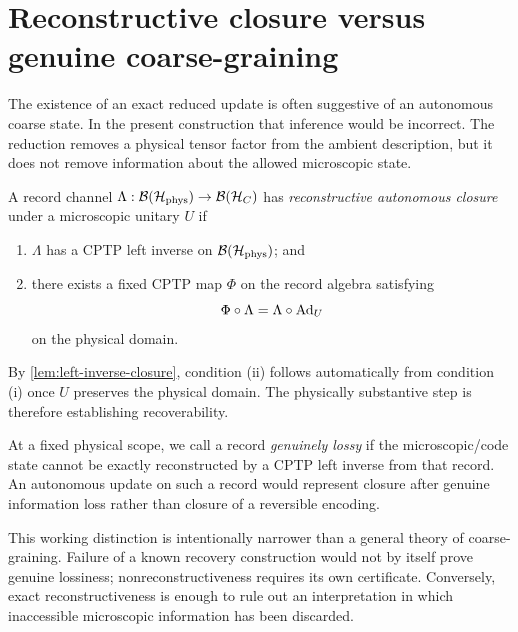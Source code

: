 \section{Reconstructive closure versus genuine coarse-graining}
\label{sec:reconstruction}

The existence of an exact reduced update is often suggestive of an autonomous coarse state.  In the present construction that inference would be incorrect.  The reduction removes a physical tensor factor from the ambient description, but it does not remove information about the allowed microscopic state.

\begin{definition}
A record channel $\Lambda:\mathcal B(\mathcal H_{\mathrm{phys}})\to\mathcal B(\mathcal H_C)$ has \emph{reconstructive autonomous closure} under a microscopic unitary $U$ if
\begin{enumerate}[label=(\roman*)]
  \item $\Lambda$ has a CPTP left inverse on $\mathcal B(\mathcal H_{\mathrm{phys}})$; and
  \item there exists a fixed CPTP map $\Phi$ on the record algebra satisfying
  \begin{equation}
    \Phi\circ\Lambda=\Lambda\circ\operatorname{Ad}_U
  \end{equation}
  on the physical domain.
\end{enumerate}
\end{definition}

By \cref{lem:left-inverse-closure}, condition (ii) follows automatically from condition (i) once $U$ preserves the physical domain.  The physically substantive step is therefore establishing recoverability.

\begin{definition}
At a fixed physical scope, we call a record \emph{genuinely lossy} if the microscopic/code state cannot be exactly reconstructed by a CPTP left inverse from that record.  An autonomous update on such a record would represent closure after genuine information loss rather than closure of a reversible encoding.
\end{definition}

This working distinction is intentionally narrower than a general theory of coarse-graining.  Failure of a known recovery construction would not by itself prove genuine lossiness; nonreconstructiveness requires its own certificate.  Conversely, exact reconstructiveness is enough to rule out an interpretation in which inaccessible microscopic information has been discarded.

